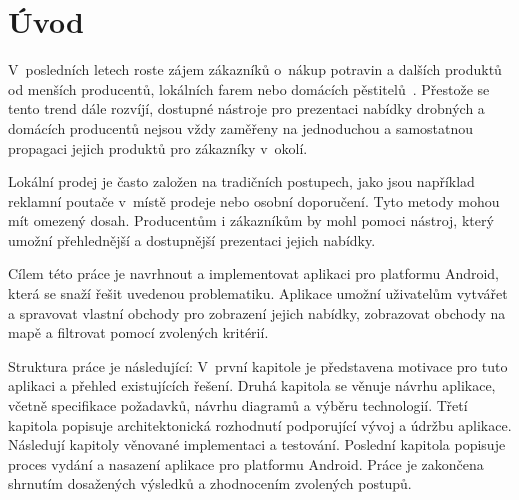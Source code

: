 \chapter*{Úvod}

V~posledních letech roste zájem zákazníků o~nákup potravin a dalších produktů od menších producentů, lokálních farem nebo domácích pěstitelů~\parencite{lokalni_potraviny_zajem, szif_2025}.
Přestože se tento trend dále rozvíjí, dostupné nástroje pro prezentaci nabídky drobných a domácích producentů nejsou vždy zaměřeny na jednoduchou a samostatnou propagaci jejich produktů pro zákazníky v~okolí.

Lokální prodej je často založen na tradičních postupech, jako jsou například reklamní poutače v~místě prodeje nebo osobní doporučení.
Tyto metody mohou mít omezený dosah.
Producentům i zákazníkům by mohl pomoci nástroj, který umožní přehlednější a dostupnější prezentaci jejich nabídky.

Cílem této práce je navrhnout a implementovat aplikaci pro platformu Android, která se snaží řešit uvedenou problematiku.
Aplikace umožní uživatelům vytvářet a spravovat vlastní obchody pro zobrazení jejich nabídky, zobrazovat obchody na mapě a filtrovat pomocí zvolených kritérií.

Struktura práce je následující:
V~první kapitole je představena motivace pro tuto aplikaci a přehled existujících řešení.
Druhá kapitola se věnuje návrhu aplikace, včetně specifikace požadavků, návrhu diagramů a výběru technologií.
Třetí kapitola popisuje architektonická rozhodnutí podporující vývoj a údržbu aplikace.
Následují kapitoly věnované implementaci a testování.
Poslední kapitola popisuje proces vydání a nasazení aplikace pro platformu Android.
Práce je zakončena shrnutím dosažených výsledků a zhodnocením zvolených postupů.
